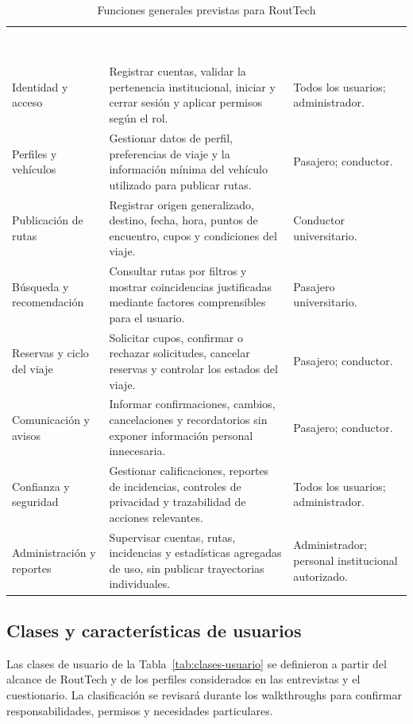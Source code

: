 \documentclass[12pt,a4paper]{article}
\begin{document}
\begin{table}[H]
\centering
\caption{Funciones generales previstas para RoutTech}
\label{tab:funciones-generales}
\small
{}
\begin{tabularx}{\textwidth}{L{3.2cm} Y L{3.0cm}}
\textcolor{white}{\textbf{Área funcional}} &
\textcolor{white}{\textbf{Descripción general}} &
\textcolor{white}{\textbf{Usuarios principales}}\\
Identidad y acceso & Registrar cuentas, validar la pertenencia institucional, iniciar y cerrar sesión y aplicar permisos según el rol. & Todos los usuarios; administrador.\\
Perfiles y vehículos & Gestionar datos de perfil, preferencias de viaje y la información mínima del vehículo utilizado para publicar rutas. & Pasajero; conductor.\\
Publicación de rutas & Registrar origen generalizado, destino, fecha, hora, puntos de encuentro, cupos y condiciones del viaje. & Conductor universitario.\\
Búsqueda y recomendación & Consultar rutas por filtros y mostrar coincidencias justificadas mediante factores comprensibles para el usuario. & Pasajero universitario.\\
Reservas y ciclo del viaje & Solicitar cupos, confirmar o rechazar solicitudes, cancelar reservas y controlar los estados del viaje. & Pasajero; conductor.\\
Comunicación y avisos & Informar confirmaciones, cambios, cancelaciones y recordatorios sin exponer información personal innecesaria. & Pasajero; conductor.\\
Confianza y seguridad & Gestionar calificaciones, reportes de incidencias, controles de privacidad y trazabilidad de acciones relevantes. & Todos los usuarios; administrador.\\
Administración y reportes & Supervisar cuentas, rutas, incidencias y estadísticas agregadas de uso, sin publicar trayectorias individuales. & Administrador; personal institucional autorizado.\\
\end{tabularx}
\end{table}

\subsection{Clases y características de usuarios}

Las clases de usuario de la Tabla~\ref{tab:clases-usuario} se definieron a partir del alcance de RoutTech y de los perfiles considerados en las entrevistas y el cuestionario. La clasificación se revisará durante los walkthroughs para confirmar responsabilidades, permisos y necesidades particulares.
\end{document}
